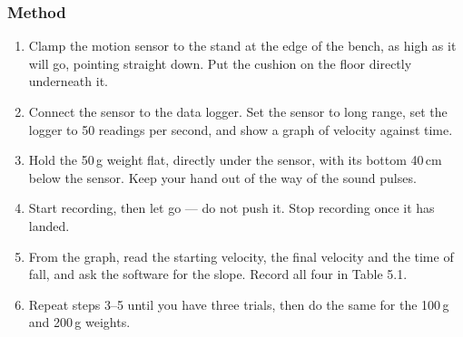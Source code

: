 \documentclass[11pt,a4paper]{article}
\begin{document}
\subsubsection*{Method}
\begin{enumerate}[itemsep=2pt]
  \item Clamp the motion sensor to the stand at the edge of the bench, as high as it will go, pointing straight down. Put the cushion on the floor directly underneath it.
  \item Connect the sensor to the data logger. Set the sensor to long range, set the logger to 50 readings per second, and show a graph of velocity against time.
  \item Hold the 50\,g weight flat, directly under the sensor, with its bottom 40\,cm below the sensor. Keep your hand out of the way of the sound pulses.
  \item Start recording, then let go --- do not push it. Stop recording once it has landed.
  \item From the graph, read the starting velocity, the final velocity and the time of fall, and ask the software for the slope. Record all four in Table 5.1.
  \item Repeat steps 3--5 until you have three trials, then do the same for the 100\,g and 200\,g weights.
\end{enumerate}

\end{document}
